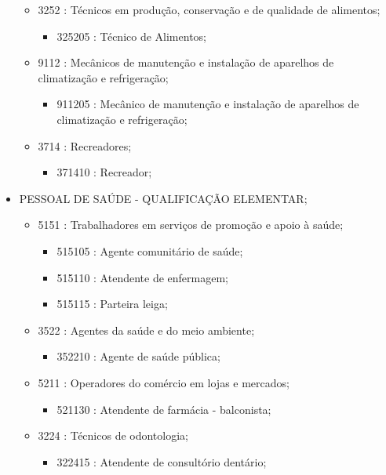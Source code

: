 \begin{itemize}
\begin{itemize}
\begin{itemize}
    \end{itemize}
    \item 3252 : Técnicos em produção, conservação  e de qualidade de alimentos;
    \begin{itemize}
      \item 325205 : Técnico de Alimentos;
    \end{itemize}
    \item 9112 : Mecânicos de manutenção e instalação de aparelhos de  climatização e refrigeração;
    \begin{itemize}
      \item 911205 : Mecânico de manutenção e instalação de aparelhos de climatização e refrigeração;
    \end{itemize}
    \item 3714 : Recreadores;
    \begin{itemize}
      \item 371410 : Recreador;
    \end{itemize}
  \end{itemize}
  \item PESSOAL DE SAÚDE - QUALIFICAÇÃO ELEMENTAR;
  \begin{itemize}
    \item 5151 : Trabalhadores em serviços de promoção e apoio à saúde;
    \begin{itemize}
      \item 515105 : Agente comunitário de saúde;
      \item 515110 : Atendente de enfermagem;
      \item 515115 : Parteira leiga;
    \end{itemize}
    \item 3522 : Agentes da saúde e do meio ambiente;
    \begin{itemize}
      \item 352210 : Agente de saúde pública;
    \end{itemize}
    \item 5211 : Operadores do comércio em lojas e mercados;
    \begin{itemize}
      \item 521130 : Atendente de farmácia - balconista;
    \end{itemize}
    \item 3224 : Técnicos de odontologia;
    \begin{itemize}
      \item 322415 : Atendente de consultório dentário;
    \end{itemize}

\end{itemize}
\end{itemize}
